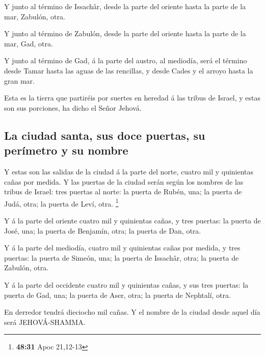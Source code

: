  Y junto al término de Issachâr, desde la parte del oriente
hasta la parte de la mar, Zabulón, otra.

 Y junto al término de Zabulón, desde la parte del oriente
hasta la parte de la mar, Gad, otra.

 Y junto al término de Gad, á la parte del austro, al
mediodía, será el término desde Tamar hasta las aguas de las rencillas,
y desde Cades y el arroyo hasta la gran mar.

 Esta es la tierra que partiréis por suertes en heredad á
las tribus de Israel, y estas son sus porciones, ha dicho el Señor
Jehová.

\hypertarget{la-ciudad-santa-sus-doce-puertas-su-peruxedmetro-y-su-nombre}{%
\subsection{La ciudad santa, sus doce puertas, su perímetro y su
nombre}\label{la-ciudad-santa-sus-doce-puertas-su-peruxedmetro-y-su-nombre}}

 Y estas son las salidas de la ciudad á la parte del norte,
cuatro mil y quinientas cañas por medida.  Y las puertas de
la ciudad serán según los nombres de las tribus de Israel: tres puertas
al norte: la puerta de Rubén, una; la puerta de Judá, otra; la puerta de
Leví, otra. \footnote{\textbf{48:31} Apoc 21,12-13}

 Y á la parte del oriente cuatro mil y quinientas cañas, y
tres puertas: la puerta de José, una; la puerta de Benjamín, otra; la
puerta de Dan, otra.

 Y á la parte del mediodía, cuatro mil y quinientas cañas
por medida, y tres puertas: la puerta de Simeón, una; la puerta de
Issachâr, otra; la puerta de Zabulón, otra.

 Y á la parte del occidente cuatro mil y quinientas cañas,
y sus tres puertas: la puerta de Gad, una; la puerta de Aser, otra; la
puerta de Nephtalí, otra.

 En derredor tendrá dieciocho mil cañas. Y el nombre de la
ciudad desde aquel día será JEHOVÁ-SHAMMA.
